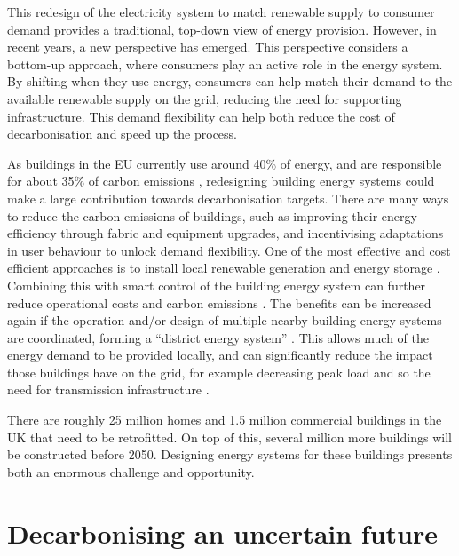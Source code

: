 This redesign of the electricity system to match renewable supply to consumer demand provides a traditional, top-down view of energy provision. However, in recent years, a new perspective has emerged. This perspective considers a bottom-up approach, where consumers play an active role in the energy system. By shifting when they use energy, consumers can help match their demand to the available renewable supply on the grid, reducing the need for supporting infrastructure. This demand flexibility can help both reduce the cost of decarbonisation and speed up the process.

As buildings in the EU currently use around 40\% of energy, and are responsible for about 35\% of carbon emissions , redesigning building energy systems could make a large contribution towards decarbonisation targets. There are many ways to reduce the carbon emissions of buildings, such as improving their energy efficiency through fabric and equipment upgrades, and incentivising adaptations in user behaviour to unlock demand flexibility. One of the most effective and cost efficient approaches is to install local renewable generation and energy storage . Combining this with smart control of the building energy system can further reduce operational costs and carbon emissions . The benefits can be increased again if the operation and/or design of multiple nearby building energy systems are coordinated, forming a ``district energy system'' . This allows much of the energy demand to be provided locally, and can significantly reduce the impact those buildings have on the grid, for example decreasing peak load and so the need for transmission infrastructure .

There are roughly 25 million homes  and 1.5 million commercial buildings  in the UK that need to be retrofitted. On top of this, several million more buildings will be constructed before 2050. Designing energy systems for these buildings presents both an enormous challenge and opportunity.


\section{Decarbonising an uncertain future}

